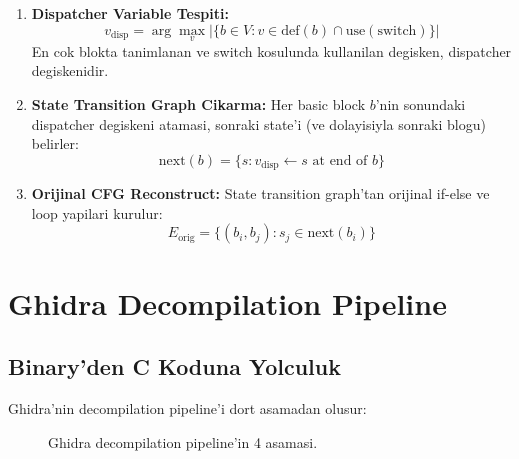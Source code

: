 \begin{enumerate}
  \item \textbf{Dispatcher Variable Tespiti:}
  \begin{equation}
    v_{\text{disp}} = \arg\max_{v} \bigl|\{b \in V : v \in \text{def}(b) \cap \text{use}(\text{switch})\}\bigr|
    \label{eq:dispatcher-var}
  \end{equation}
  En cok blokta tanimlanan ve switch kosulunda kullanilan degisken,
  dispatcher degiskenidir.

  \item \textbf{State Transition Graph Cikarma:}
  Her basic block $b$'nin sonundaki dispatcher degiskeni atamasi,
  sonraki state'i (ve dolayisiyla sonraki blogu) belirler:
  \begin{equation}
    \text{next}(b) = \{s : v_{\text{disp}} \gets s \text{ at end of } b\}
    \label{eq:state-transition}
  \end{equation}

  \item \textbf{Orijinal CFG Reconstruct:} State transition graph'tan
  orijinal if-else ve loop yapilari kurulur:
  \begin{equation}
    E_{\text{orig}} = \{(b_i, b_j) : s_j \in \text{next}(b_i)\}
    \label{eq:cfg-reconstruct}
  \end{equation}
\end{enumerate}


\section{Ghidra Decompilation Pipeline}
\label{sec:ghidra-pipeline}

\subsection{Binary'den C Koduna Yolculuk}

Ghidra'nin decompilation pipeline'i dort asamadan olusur:

\begin{figure}[htbp]
\centering
{}
\caption{Ghidra decompilation pipeline'in 4 asamasi.}
\label{fig:ghidra-pipeline}
\end{figure}

